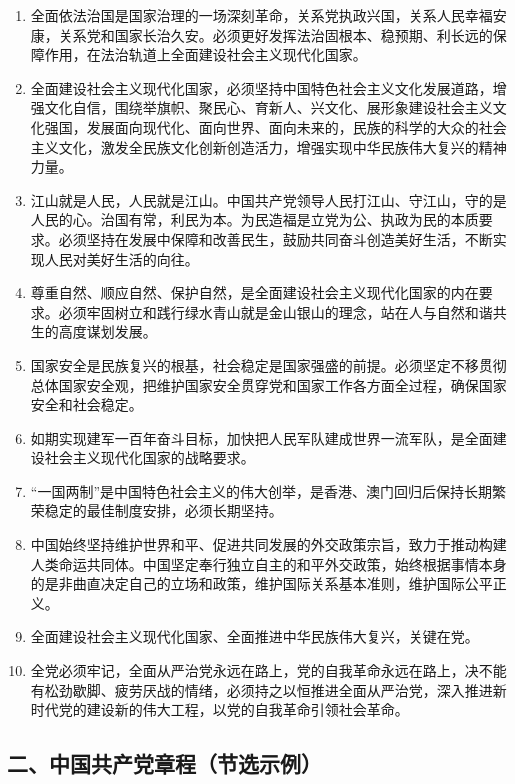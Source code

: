 \documentclass[UTF8,11pt,a4paper]{ctexart}
\begin{document}
\begin{enumerate}[label=\arabic*., leftmargin=2.3em]
\item 全面依法治国是国家治理的一场深刻革命，关系党执政兴国，关系人民幸福安康，关系党和国家长治久安。必须更好发挥法治固根本、稳预期、利长远的保障作用，在法治轨道上全面建设社会主义现代化国家。
\item 全面建设社会主义现代化国家，必须坚持中国特色社会主义文化发展道路，增强文化自信，围绕举旗帜、聚民心、育新人、兴文化、展形象建设社会主义文化强国，发展面向现代化、面向世界、面向未来的，民族的科学的大众的社会主义文化，激发全民族文化创新创造活力，增强实现中华民族伟大复兴的精神力量。
\item 江山就是人民，人民就是江山。中国共产党领导人民打江山、守江山，守的是人民的心。治国有常，利民为本。为民造福是立党为公、执政为民的本质要求。必须坚持在发展中保障和改善民生，鼓励共同奋斗创造美好生活，不断实现人民对美好生活的向往。
\item 尊重自然、顺应自然、保护自然，是全面建设社会主义现代化国家的内在要求。必须牢固树立和践行绿水青山就是金山银山的理念，站在人与自然和谐共生的高度谋划发展。
\item 国家安全是民族复兴的根基，社会稳定是国家强盛的前提。必须坚定不移贯彻总体国家安全观，把维护国家安全贯穿党和国家工作各方面全过程，确保国家安全和社会稳定。
\item 如期实现建军一百年奋斗目标，加快把人民军队建成世界一流军队，是全面建设社会主义现代化国家的战略要求。
\item “一国两制”是中国特色社会主义的伟大创举，是香港、澳门回归后保持长期繁荣稳定的最佳制度安排，必须长期坚持。
\item 中国始终坚持维护世界和平、促进共同发展的外交政策宗旨，致力于推动构建人类命运共同体。中国坚定奉行独立自主的和平外交政策，始终根据事情本身的是非曲直决定自己的立场和政策，维护国际关系基本准则，维护国际公平正义。
\item 全面建设社会主义现代化国家、全面推进中华民族伟大复兴，关键在党。
\item 全党必须牢记，全面从严治党永远在路上，党的自我革命永远在路上，决不能有松劲歇脚、疲劳厌战的情绪，必须持之以恒推进全面从严治党，深入推进新时代党的建设新的伟大工程，以党的自我革命引领社会革命。
\end{enumerate}

\subsection*{二、中国共产党章程（节选示例）}
\end{document}
